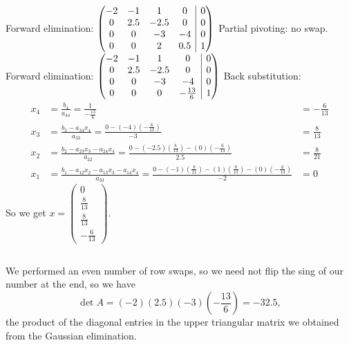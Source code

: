 \documentclass[11pt]{article}
\makeatletter
\newenvironment{amatrix}[1]{%
  \left(\begin{array}{@{}*{#1}{c}|c@{}}
}{%
  \end{array}\right)
}
\makeatother
\begin{document}
Forward elimination:
$\begin{amatrix}{4}
	-2 & -1 & 1 & 0 & 0\\
	0 & 2.5 & -2.5 & 0 & 0\\
	0 & 0 & -3 & -4 & 0\\
	0 & 0 & 2 & 0.5 & 1
\end{amatrix}$
\newline
\newline
Partial pivoting: no swap. Forward elimination:
$\begin{amatrix}{4}
	-2 & -1 & 1 & 0 & 0\\
	0 & 2.5 & -2.5 & 0 & 0\\
	0 & 0 & -3 & -4 & 0\\
	0 & 0 & 0 & -\frac{13}{6} & 1
\end{amatrix}$
\newline
\newline
Back substitution:
\newline
\newline
\begin{align*}
	x_4&=\frac{b_4}{a_{44}}=\frac{1}{-\frac{13}{6}}&=-\frac{6}{13}\\
	x_3&=\frac{b_3-a_{34}x_4}{a_{33}}=\frac{0-(-4)(-\frac{6}{13})}{-3}&=\frac{8}{13}\\
	x_2&=\frac{b_2-a_{23}x_3-a_{24}x_4}{a_{22}}=\frac{0-(-2.5)(\frac{8}{13})-(0)(-\frac{6}{13})}{2.5}&=\frac{8}{21}\\
	x_1&=\frac{b_1-a_{12}x_2-a_{13}x_3-a_{14}x_4}{a_{33}}=\frac{0-(-1)(\frac{8}{21})-(1)(\frac{8}{13})-(0)(-\frac{6}{13})}{-2}&=0
\end{align*}
So we get $x=\left(\begin{smallmatrix}0\\\frac{8}{13}\\\frac{8}{13}\\-\frac{6}{13}\end{smallmatrix}\right)$.


\subsection{} %
We performed an even number of row swaps, so we need not flip the sing of our
number at the end, so we have
\[\det A=(-2)(2.5)(-3)(-\frac{13}{6})=-32.5,\]
the product of the diagonal entries in the upper triangular matrix we obtained
from the Gaussian elimination.  

\section{} %
\end{document}
